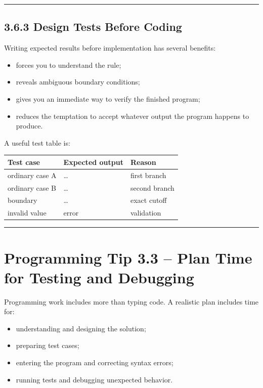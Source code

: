 \documentclass[
  11pt,
  a4paper,
]{article}
\providecommand{\tightlist}{%
  \setlength{\itemsep}{0pt}\setlength{\parskip}{0pt}}
\begin{document}
\begin{center}\rule{0.5\linewidth}{0.5pt}\end{center}

\subsection{3.6.3 Design Tests Before
Coding}\label{design-tests-before-coding}

Writing expected results before implementation has several benefits:

\begin{itemize}
\tightlist
\item
  forces you to understand the rule;
\item
  reveals ambiguous boundary conditions;
\item
  gives you an immediate way to verify the finished program;
\item
  reduces the temptation to accept whatever output the program happens
  to produce.
\end{itemize}

A useful test table is:

\begin{longtable}[]{@{}lll@{}}
\toprule\noalign{}
Test case & Expected output & Reason \\
\midrule\noalign{}
\endhead
\bottomrule\noalign{}
\endlastfoot
ordinary case A & \ldots{} & first branch \\
ordinary case B & \ldots{} & second branch \\
boundary & \ldots{} & exact cutoff \\
invalid value & error & validation \\
\end{longtable}

\begin{center}\rule{0.5\linewidth}{0.5pt}\end{center}

\section{Programming Tip 3.3 -- Plan Time for Testing and
Debugging}\label{programming-tip-3.3-plan-time-for-testing-and-debugging}

Programming work includes more than typing code. A realistic plan
includes time for:

\begin{itemize}
\tightlist
\item
  understanding and designing the solution;
\item
  preparing test cases;
\item
  entering the program and correcting syntax errors;
\item
  running tests and debugging unexpected behavior.
\end{itemize}
\end{document}

